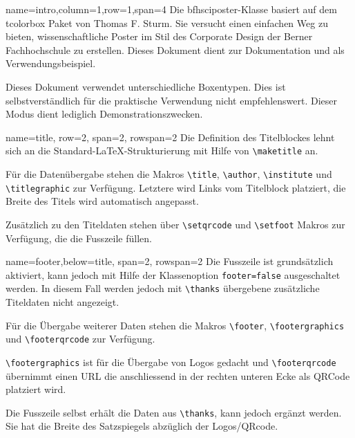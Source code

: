\documentclass[
	paper=a0,%
	style=ruled, %
	]{bfhsciposter}
\newcommand{\tbs}{\textbackslash}
\let\code\texttt
\newcommand*{\macro}[1]{\code{\tbs#1}}
\let\pck\textsf
\let\cls\textsf
\begin{document}
\begin{tcbposter}[
	poster={
		columns=4,
		rows=7,
		spacing=1cm,
	},]

\begin{posterboxenv}[,BFH-abstract,title=Zusammenfassung]{name=intro,column=1,row=1,span=4}
	Die \cls{bfhsciposter}-Klasse basiert auf dem \pck{tcolorbox} Paket von Thomas F. Sturm.
	Sie versucht einen einfachen Weg zu bieten, wissenschaftliche Poster im Stil des Corporate Design der Berner Fachhochschule zu erstellen. Dieses Dokument dient zur Dokumentation und als Verwendungsbeispiel.

	Dieses Dokument verwendet unterschiedliche Boxentypen. Dies ist selbstverständlich für die praktische Verwendung nicht empfehlenswert. Dieser Modus dient lediglich Demonstrationszwecken.
\end{posterboxenv}

\begin{posterboxenv}[title=Titelei]{name=title, row=2, span=2, rowspan=2}
	Die Definition des Titelblockes lehnt sich an die Standard-\LaTeX{}-Strukturierung  mit Hilfe von \macro{maketitle} an.

	Für die Datenübergabe stehen die Makros \macro{title}, \macro{author}, \macro{institute} und \macro{titlegraphic} zur Verfügung. Letztere wird Links vom Titelblock platziert, die Breite des Titels wird automatisch angepasst.

	Zusätzlich zu den Titeldaten stehen über \macro{setqrcode} und \macro{setfoot} Makros zur Verfügung, die die Fusszeile füllen.
\end{posterboxenv}

\begin{posterboxenv}[title=Fusszeile]{name=footer,below=title, span=2, rowspan=2 }
	Die Fusszeile ist grundsätzlich aktiviert, kann jedoch mit Hilfe der Klassenoption \code{footer=false} ausgeschaltet werden. In diesem Fall werden jedoch mit \macro{thanks} übergebene zusätzliche Titeldaten nicht angezeigt.

	Für die Übergabe weiterer Daten stehen die Makros \macro{footer}, \macro{footergraphics} und \macro{footerqrcode} zur Verfügung.

	\macro{footergraphics} ist für die Übergabe von Logos gedacht und \macro{footerqrcode} übernimmt einen URL die anschliessend in der rechten unteren Ecke als QRCode platziert wird.

	Die Fusszeile selbst erhält die Daten aus \macro{thanks}, kann jedoch ergänzt werden. Sie hat die Breite des Satzspiegels abzüglich der Logos/QRcode.


\end{posterboxenv}
\end{tcbposter}
\end{document}
